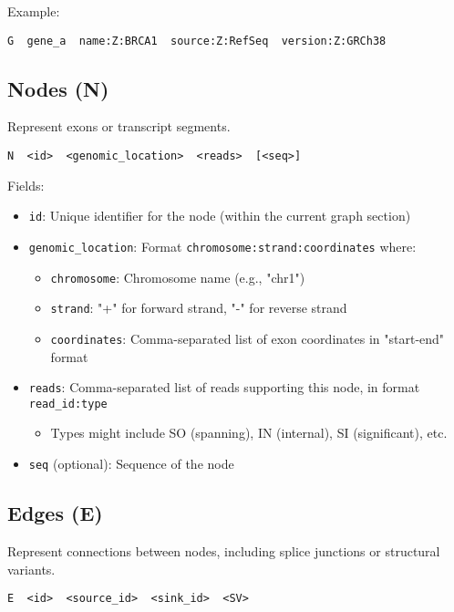 \documentclass{article}
\begin{document}
Example:
\begin{lstlisting}
G  gene_a  name:Z:BRCA1  source:Z:RefSeq  version:Z:GRCh38
\end{lstlisting}

\subsection{Nodes (N)}

Represent exons or transcript segments.

\begin{lstlisting}
N  <id>  <genomic_location>  <reads>  [<seq>]
\end{lstlisting}

Fields:
\begin{itemize}
	\item \texttt{id}: Unique identifier for the node (within the current graph section)
	\item \texttt{genomic\_location}: Format \texttt{chromosome:strand:coordinates} where:
	      \begin{itemize}
		      \item \texttt{chromosome}: Chromosome name (e.g., "chr1")
		      \item \texttt{strand}: "+" for forward strand, "-" for reverse strand
		      \item \texttt{coordinates}: Comma-separated list of exon coordinates in "start-end" format
	      \end{itemize}
	\item \texttt{reads}: Comma-separated list of reads supporting this node, in format \texttt{read\_id:type}
	      \begin{itemize}
		      \item Types might include SO (spanning), IN (internal), SI (significant), etc.
	      \end{itemize}
	\item \texttt{seq} (optional): Sequence of the node
\end{itemize}

\subsection{Edges (E)}

Represent connections between nodes, including splice junctions or structural variants.

\begin{lstlisting}
E  <id>  <source_id>  <sink_id>  <SV>
\end{lstlisting}
\end{document}
